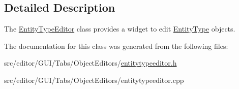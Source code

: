 \subsection{\-Detailed \-Description}
\-The \hyperlink{class_entity_type_editor}{\-Entity\-Type\-Editor} class provides a widget to edit \hyperlink{class_entity_type}{\-Entity\-Type} objects. 

\-The documentation for this class was generated from the following files\-:\begin{DoxyCompactItemize}
\item 
src/editor/\-G\-U\-I/\-Tabs/\-Object\-Editors/\hyperlink{entitytypeeditor_8h}{entitytypeeditor.\-h}\item 
src/editor/\-G\-U\-I/\-Tabs/\-Object\-Editors/entitytypeeditor.\-cpp\end{DoxyCompactItemize}
